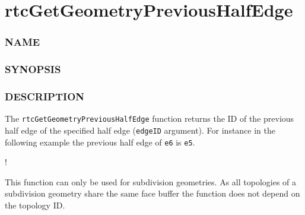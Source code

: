 \pagebreak

\section{rtcGetGeometryPreviousHalfEdge}\label{rtcgetgeometryprevioushalfedge}

\subsubsection{NAME}\label{name}

\begin{Shaded}
\begin{Highlighting}[]
\OperatorTok{{-}}
\end{Highlighting}
\end{Shaded}

\subsubsection{SYNOPSIS}\label{synopsis}

\begin{Shaded}
\begin{Highlighting}[]

 \OperatorTok{(}
\OperatorTok{,}
   
\OperatorTok{);}
\end{Highlighting}
\end{Shaded}

\subsubsection{DESCRIPTION}\label{description}

The \texttt{rtcGetGeometryPreviousHalfEdge} function returns the ID of
the previous half edge of the specified half edge (\texttt{edgeID}
argument). For instance in the following example the previous half edge
of \texttt{e6} is \texttt{e5}.

!\href{images/half_edges.pdf}{}

This function can only be used for subdivision geometries. As all
topologies of a subdivision geometry share the same face buffer the
function does not depend on the topology ID.

